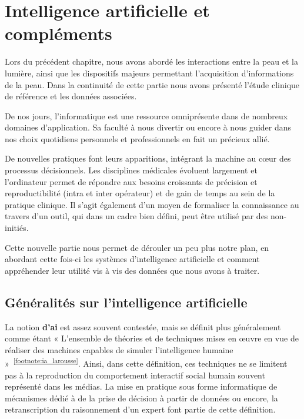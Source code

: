 \chapter{Intelligence artificielle et compléments}
\label{chap:chapter_3}
\chapterintro
Lors du précédent chapitre, nous avons abordé les interactions entre la peau et la lumière, ainsi que les dispositifs majeurs permettant l'acquisition d'informations de la peau. Dans la continuité de cette partie nous avons présenté l'étude clinique de référence et les données associées.\par

De nos jours, l’informatique est une ressource omniprésente dans de nombreux domaines d’application. Sa faculté à nous divertir ou encore à nous guider dans nos choix quotidiens personnels et professionnels en fait un précieux allié.\par 

De nouvelles pratiques font leurs apparitions, intégrant la machine au cœur des processus décisionnels. Les disciplines médicales évoluent largement et l’ordinateur permet de répondre aux besoins croissants de précision et reproductibilité (intra et inter opérateur) et de gain de temps au sein de la pratique clinique. Il s’agit également d’un moyen de formaliser la connaissance au travers d’un outil, qui dans un cadre bien défini, peut être utilisé par des non-initiés.\par

Cette nouvelle partie nous permet de dérouler un peu plus notre plan, en abordant cette fois-ci les systèmes d'intelligence artificielle et comment appréhender leur utilité vis à vis des données que nous avons à traiter.\par
\newpage

\section{Généralités sur l'intelligence artificielle}
\label{sec:artificial_intelligence}
La notion \textbf{d’\gls{ai}} est assez souvent contestée, mais se définit plus généralement comme étant « L’ensemble de théories et de techniques mises en œuvre en vue de réaliser des machines capables de simuler l'intelligence humaine »~\textsuperscript{\ref{footnote:ia_larousse}}. Ainsi, dans cette définition, ces techniques ne se limitent pas à la reproduction du comportement interactif social humain souvent représenté dans les médias. La mise en pratique sous forme informatique de mécanismes dédié à de la prise de décision à partir de données ou encore, la retranscription du raisonnement d'un expert font partie de cette définition.\par

